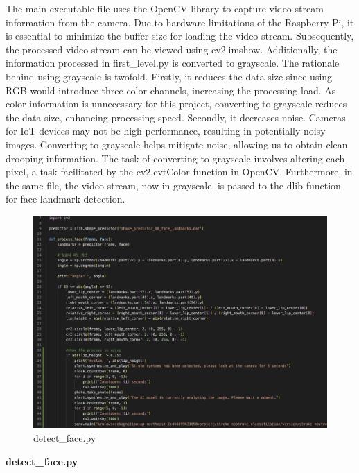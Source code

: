 The main executable file uses the OpenCV library to capture video stream information from the camera. Due to hardware limitations of the Raspberry Pi, it is essential to minimize the buffer size for loading the video stream. Subsequently, the processed video stream can be viewed using cv2.imshow. Additionally, the information processed in first\_level.py is converted to grayscale. The rationale behind using grayscale is twofold. Firstly, it reduces the data size since using RGB would introduce three color channels, increasing the processing load. As color information is unnecessary for this project, converting to grayscale reduces the data size, enhancing processing speed. Secondly, it decreases noise. Cameras for IoT devices may not be high-performance, resulting in potentially noisy images. Converting to grayscale helps mitigate noise, allowing us to obtain clean drooping information. The task of converting to grayscale involves altering each pixel, a task facilitated by the cv2.cvtColor function in OpenCV. Furthermore, in the same file, the video stream, now in grayscale, is passed to the dlib function for face landmark detection.\\

\begin{figure}[h]
    \centering
    \includegraphics[width=0.5\linewidth]{images/detect_face.png}
    \caption{detect\_face.py}
    \label{fig:enter-label}
\end{figure}

\textbf{detect\_face.py}

